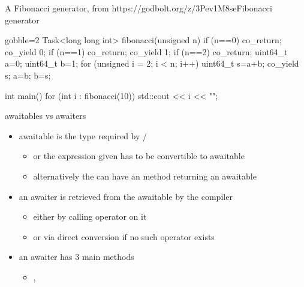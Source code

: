 \begin{frame}[fragile]
  \begin{exampleblockGB}{A Fibonacci generator, from }{https://godbolt.org/z/3Pev1M8se}{Fibonacci generator}
    \scriptsize
     \begin{cppcode*}{gobble=2}
       Task<long long int> fibonacci(unsigned n) {
         if (n==0) co_return;
         co_yield 0;
         if (n==1) co_return;
         co_yield 1;
         if (n==2) co_return;
         uint64_t a=0;
         uint64_t b=1;
         for (unsigned i = 2; i < n; i++) {
           uint64_t s=a+b;
           co_yield s;
           a=b;
           b=s;
         }
       }

       int main() {
         for (int i : fibonacci(10)) {
           std::cout << i << "\n";
         }
       }
    \end{cppcode*}
  \end{exampleblockGB}
\end{frame}

\begin{frame}
  \begin{block}{awaitables vs awaiters}
    \begin{itemize}
    \item awaitable is the type required by /
      \begin{itemize}
      \item or the expression given has to be convertible to awaitable
      \item alternatively the  can have an  method returning an awaitable
      \end{itemize}
    \item an awaiter is retrieved from the awaitable by the compiler
      \begin{itemize}
      \item either by calling operator  on it
      \item or via direct conversion if no such operator exists
      \end{itemize}
    \item an awaiter has 3 main methods
      \begin{itemize}
      \item {},  
      \end{itemize}
    \end{itemize}
  \end{block}
\end{frame}

